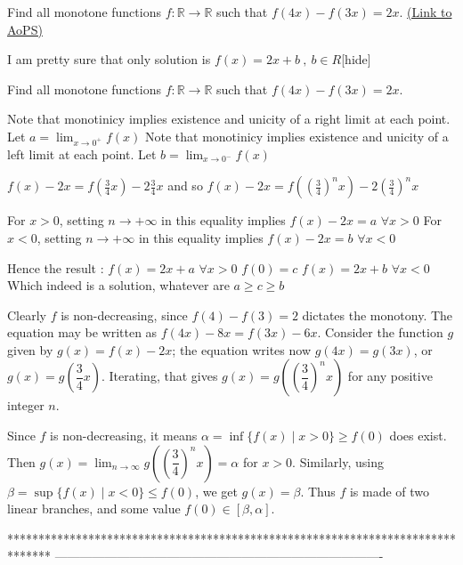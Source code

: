 \begin{problem}
	Find all monotone functions $f: \mathbb{R}\to\mathbb{R}$ such that $f(4x)-f(3x)=2x$.
	\flushright \href{https://artofproblemsolving.com/community/c6h608991}{(Link to AoPS)}
\end{problem}



\begin{solution}I am pretty sure that only solution is $f(x)=2x+b\ ,\ b\in R$[\/hide]
\end{solution}



\begin{solution}
	\begin{tcolorbox}Find all monotone functions $f: \mathbb{R}\to\mathbb{R}$ such that $f(4x)-f(3x)=2x$.\end{tcolorbox}
Note that monotinicy implies existence and unicity of a right limit at each point. Let $a=\lim_{x\to 0^+}f(x)$
Note that monotinicy implies existence and unicity of a left limit at each point. Let $b=\lim_{x\to 0^-}f(x)$

$f(x)-2x=f(\frac 34x)-2\frac 34x$ and so $f(x)-2x=f((\frac 34)^nx)-2(\frac 34)^nx$

For $x>0$, setting $n\to+\infty$ in this equality implies $f(x)-2x=a$ $\forall x>0$
For $x<0$, setting $n\to+\infty$ in this equality implies $f(x)-2x=b$ $\forall x<0$

Hence the result :
$f(x)=2x+a$ $\forall x>0$
$f(0)=c$
$f(x)=2x+b$ $\forall x<0$
Which indeed is a solution, whatever are $a\ge c\ge b$
\end{solution}



\begin{solution}
	Clearly $f$ is non-decreasing, since $f(4)-f(3) = 2$ dictates the monotony. The equation may be written as $f(4x) - 8x = f(3x) - 6x$. Consider the function $g$ given by $g(x) = f(x)-2x$; the equation writes now $g(4x) = g(3x)$, or $g(x) = g\left (\dfrac {3}{4} x\right )$. Iterating, that gives $g(x) = g\left (\left (\dfrac {3}{4}\right )^n x\right )$ for any positive integer $n$.

Since $f$ is non-decreasing, it means $\alpha = \inf \{f(x) \mid x>0\} \geq f(0)$ does exist. Then  $g(x) =\lim_{n\to \infty} g\left (\left (\dfrac {3}{4}\right )^n x\right ) = \alpha$ for $x>0$. Similarly, using  $\beta = \sup \{f(x) \mid x<0\} \leq f(0)$, we get $g(x) = \beta$. Thus $f$ is made of two linear branches, and some value $f(0) \in [\beta, \alpha]$.
\end{solution}
*******************************************************************************
-------------------------------------------------------------------------------

